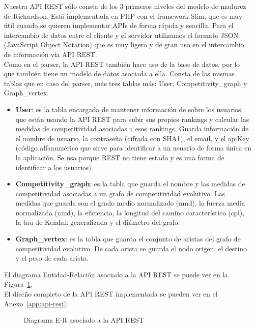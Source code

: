 Nuestra API REST sólo consta de los 3 primeros niveles del modelo de madurez de Richardson. Está implementada en PHP con el framework Slim, que es muy útil cuando se quieren implementar APIs de forma rápida y sencilla. Para el intercambio de datos entre el cliente y el servidor utilizamos el formato JSON (JavaScript Object Notation) que es muy ligero y de gran uso en el intercambio de información vía API REST.\\

Como en el parser, la API REST también hace uso de la base de datos, por lo que también tiene un modelo de datos asociada a ella. Consta de las mismas tablas que en caso del parser, más tres tablas más: User, Competitivity\_graph y Graph\_vertex.

\begin{itemize}
\item \textbf{User}: es la tabla encargada de mantener información de sobre los usuarios que están usando la API REST para subir sus propios rankings y calcular las medidas de competitividad asociadas a esos rankings. Guarda información de el nombre de usuario, la contraseña (cifrada con SHA1), el email, y el apiKey (código alfanumérico que sirve para identificar a un usuario de forma única en la aplicación. Se usa porque REST no tiene estado y es una forma de identificar a los usuarios).

\item \textbf{Competitivity\_graph}: es la tabla que guarda el nombre y las medidas de competitividad asociadas a un grafo de competitividad evolutivo. Las medidas que guarda son el grado medio normalizado (nmd), la fuerza media normalizada (nmd), la eficiencia, la longitud del camino característico (cpl), la tau de Kendall generalizada y el diámetro del grafo.

\item \textbf{Graph\_vertex}: es la tabla que guarda el conjunto de aristas del grafo de competitividad evolutivo. De cada arista se guarda el nodo origen, el destino y el peso de cada arista.
\end{itemize}

El diagrama Entidad-Relación asociado a la API REST se puede ver en la Figura~\ref{fig:er-api}.\\

El diseño completo de la API REST implementada se pueden ver en el Anexo~\ref{app:api-rest}.

\begin{figure}[htb]
\centering
\erapi
\caption{Diagrama E-R asociado a la API REST}
\label{fig:er-api}
\end{figure}


